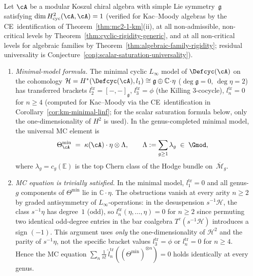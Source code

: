 \begin{theorem}\label{thm:explicit-theta}
Let $\cA$ be a modular Koszul chiral algebra with simple Lie
symmetry~$\mathfrak{g}$ satisfying
$\dim H^2_{\mathrm{cyc}}(\cA,\cA) = 1$
\textup{(}verified for Kac--Moody algebras by the
CE~identification of
Theorem~\textup{\ref{thm:mc2-1-km}}\textup{(ii)},
at all non-admissible, non-critical levels by
Theorem~\textup{\ref{thm:cyclic-rigidity-generic}},
and at all non-critical levels for algebraic families by
Theorem~\textup{\ref{thm:algebraic-family-rigidity}};
residual universality is
Conjecture~\textup{\ref{conj:scalar-saturation-universality}}\textup{)}.
\begin{enumerate}[label=\textup{(\alph*)}]

\item \emph{Minimal-model formula.}
  The minimal cyclic $L_\infty$ model of $\Defcyc(\cA)$ on the
  cohomology
  $\mathcal{H} = H^*(\Defcyc(\cA), l_1) \cong \mathfrak{g} \oplus
  \mathbb{C}\!\cdot\!\eta$
  \textup{(}$\deg \mathfrak{g} = 0$, $\deg\eta = 2$\textup{)} has
  transferred brackets $l_2^{\mathrm{tr}} = [-,-]_{\mathfrak{g}}$,
  $l_3^{\mathrm{tr}} = \phi$
  \textup{(}the Killing $3$-cocycle\textup{)},
  $l_n^{\mathrm{tr}} = 0$ for $n \geq 4$
  \textup{(}computed for Kac--Moody via the CE~identification
  in Corollary~\textup{\ref{cor:km-minimal-linf}};
  for the scalar saturation formula below, only the
  one-dimensionality of\/ $H^2$ is used\textup{)}.
  In the genus-completed minimal model, the universal MC element
  is
  \begin{equation}\label{eq:theta-minimal}
  \Theta_{\cA}^{\min}
  \;=\;
  \kappa(\cA) \cdot \eta \otimes \Lambda,
  \qquad
  \Lambda := \sum_{g \geq 1} \lambda_g \;\in\; \Gmod,
  \end{equation}
  where $\lambda_g = c_g(\mathbb{E})$ is the top Chern class of the
  Hodge bundle on~$\overline{\mathcal{M}}_g$.

\item \emph{MC equation is trivially satisfied.}
  In the minimal model, $l_1^{\mathrm{tr}} = 0$ and all genus-$g$
  components of $\Theta^{\min}$ lie in $\mathbb{C}\!\cdot\!\eta$.
  The obstructions vanish at every arity $n \geq 2$ by
  graded antisymmetry of $L_\infty$-operations: in the
  desuspension $s^{-1}\mathcal{H}$, the class
  $s^{-1}\eta$ has degree~$1$ \textup{(}odd\textup{)}, so
  $l_n^{\mathrm{tr}}(\eta, \ldots, \eta) = 0$ for $n \geq 2$
  since permuting two identical odd-degree entries
  in the bar coalgebra $T^c(s^{-1}\mathcal{H})$ introduces
  a sign $(-1)$.
  This argument uses \emph{only} the one-dimensionality
  of $\mathcal{H}^2$ and the parity of $s^{-1}\eta$, not the
  specific bracket values $l_3^{\mathrm{tr}} = \phi$ or
  $l_n^{\mathrm{tr}} = 0$ for $n \geq 4$.
  Hence the MC equation $\sum_n \frac{1}{n!}\,
  \hat{l}_n^{\mathrm{tr}}((\Theta^{\min})^{\otimes n}) = 0$
  holds identically at every genus.


\end{enumerate}
\end{theorem}
